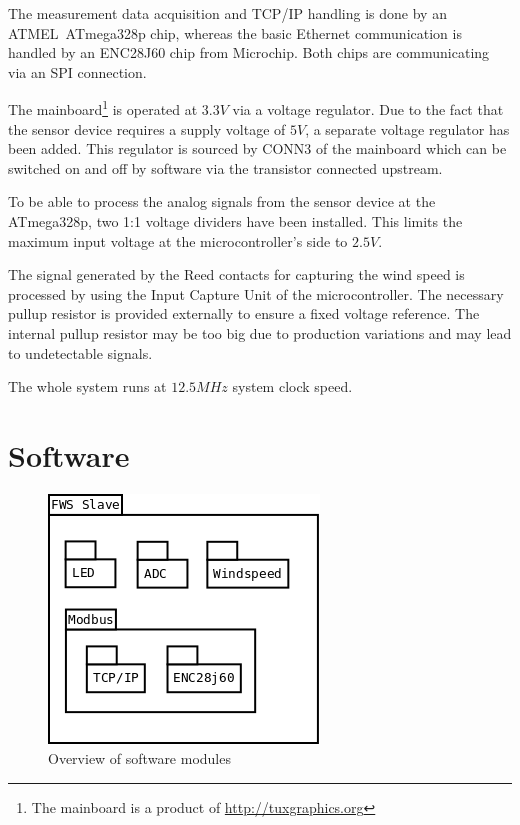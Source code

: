 The measurement data acquisition and TCP/IP handling is done by an ATMEL~ATmega328p chip, whereas the basic Ethernet communication is handled by an ENC28J60 chip from Microchip. Both chips are communicating via an SPI connection.

The mainboard\footnote{The mainboard is a product of \url{http://tuxgraphics.org}} is operated at $3.3 V$ via a voltage regulator. Due to the fact that the sensor device requires a supply voltage of $5 V$, a separate voltage regulator has been added. This regulator is sourced by CONN3 of the mainboard which can be switched on and off by software via the transistor connected upstream.

To be able to process the analog signals from the sensor device at the ATmega328p, two 1:1 voltage dividers have been installed. This limits the maximum input voltage at the microcontroller's side to $2.5 V$.

The signal generated by the Reed contacts for capturing the wind speed is processed by using the Input Capture Unit of the microcontroller. The necessary pullup resistor is provided externally to ensure a fixed voltage reference. The internal pullup resistor may be too big due to production variations and may lead to undetectable signals.

The whole system runs at $12.5 MHz$ system clock speed.

\section{Software}

\begin{figure}[H]
    \centering
    \includegraphics[width=0.6\linewidth]{graphics/fws_slave.png}
    \caption{Overview of software modules}
    \label{fig:slave_software}
\end{figure}

